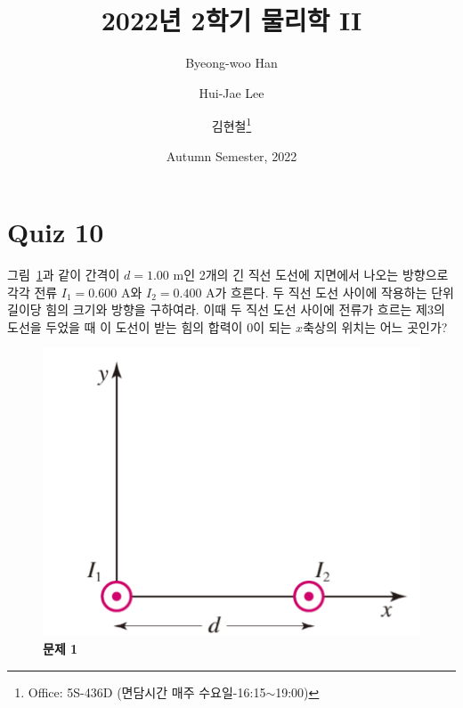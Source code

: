 \documentclass[tightenlines,floatfix,nofootinbib,superscriptaddress,fleqn]{revtex4}
\begin{document}
\title{\Large 2022년 2학기 물리학 II}
\author{Byeong-woo Han}
  \author{Hui-Jae Lee}
\author{김현철\footnote{Office: 5S-436D (면담시간 매주
    수요일-16:15$\sim$19:00)}} 
\date{Autumn Semester, 2022}

\maketitle

\section*{\large Quiz 10}
그림~\ref{fig:1}과 같이 간격이 $d=1.00$ m인 2개의 긴 직선 도선에
지면에서 나오는 방향으로 각각 전류 $I_1=0.600$ A와 $I_2=0.400$ A가
흐른다. 두 직선 도선 사이에 작용하는 단위길이당 힘의 크기와 방향을
구하여라. 이때 두 직선 도선 사이에 전류가 흐르는 제3의 도선을 두었을
때 이 도선이 받는 힘의 합력이 0이 되는 $x$축상의 위치는 어느 곳인가? 
\begin{figure}[htp]
  \centering
  \includegraphics[scale=0.4]{qfig10-20221005-1.pdf}
  \caption{\textbf{문제 1}}
  \label{fig:1}
\end{figure}
\end{document}
